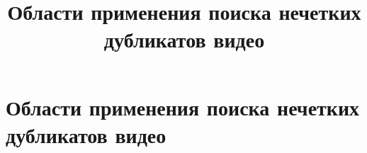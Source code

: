 \documentclass{.local/lib/classes/ndvr-super-article-standalone}
\title[NDVR thesis-abstract]{%
    Области применения поиска нечетких дубликатов видео%
}
\begin{document}
    \section{Области применения поиска нечетких дубликатов видео}

    \begin{shiftdownsection}


    \end{shiftdownsection}
\end{document}
